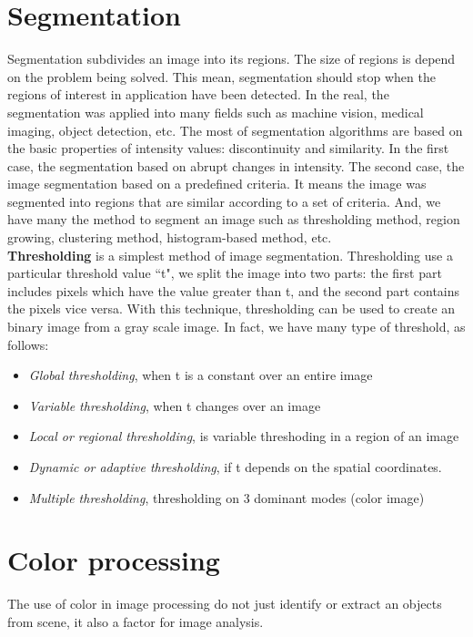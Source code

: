 \section{Segmentation}
Segmentation subdivides an image into its regions. The size of regions is depend on the problem being solved. This mean, segmentation should stop when the regions of interest in application have been detected. In the real, the segmentation was applied into many fields such as machine vision, medical imaging, object detection, etc. The most of segmentation algorithms are based on the basic properties of intensity values: discontinuity and similarity. In the first case, the segmentation based on abrupt changes in intensity. The second case, the image segmentation based on a predefined criteria. It means the image was segmented into regions that are similar according to a set of criteria. And, we have many the method to segment an image such as thresholding method, region growing, clustering method, histogram-based method, etc.\\[0.5 cm]
\textbf{Thresholding} is a simplest method of image segmentation. Thresholding use a particular threshold value ``t", we split the image into two parts: the first part includes pixels which have the value greater than t, and the second part contains the pixels vice versa. With this technique, thresholding can be used to create an binary image from a gray scale image. In fact, we have many type of threshold, as follows:
\begin{itemize}
\item \textit{Global thresholding}, when t is a constant over an entire image
\item \textit{Variable thresholding}, when t changes over an image
\item \textit{Local or regional thresholding}, is variable threshoding in a region of an image
\item \textit{Dynamic or adaptive thresholding}, if t depends on the spatial coordinates.
\item \textit{Multiple thresholding}, thresholding on 3 dominant modes (color image)
\end{itemize}
\section{Color processing}\label{color_model}
The use of color in image processing do not just identify or extract an objects from scene, it also a factor for image analysis.

